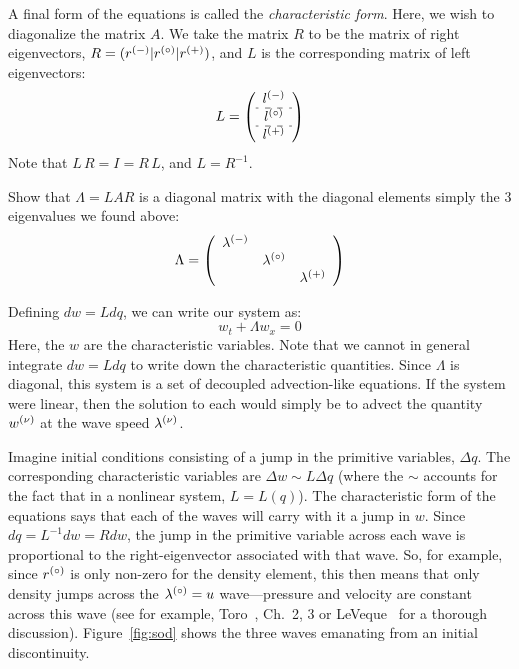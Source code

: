 A final form of the equations is called the {\em characteristic form}.  Here,
we wish to diagonalize the matrix $A$.  We take the matrix $R$ to be the
matrix of right eigenvectors, $R = (r^{(-)} | r^{(\circ)} | r^{(+)} )$, and $L$
is the corresponding matrix of left eigenvectors:
\begin{equation}
L = \left ( \begin{array}{c} l^\evm \\              
                             \hdashline 
                             l^\evz \\
                             \hdashline 
                             l^\evp \end{array} \right )
\end{equation}
Note that $L\, R = I = R\, L$, and
$L = R^{-1}$.
\begin{exercise}
{
Show that $\Lambda = L A R$ is a diagonal matrix with the diagonal elements
simply the 3 eigenvalues we found above:
\begin{equation}
\Lambda = 
   \left ( \begin{array}{ccc}
             \lambda^{(-)} &              & \\
                          & \lambda^{(\circ)} & \\
                          &              & \lambda^{(+)} \end{array} \right )
\end{equation}
}
\end{exercise}
Defining $dw = L dq$, we can write our system as:
\begin{equation}
w_t + \Lambda w_x = 0
\end{equation}
Here, the $w$ are the characteristic variables.  Note that we cannot
in general integrate $dw = L dq$ to write down the characteristic
quantities.  Since $\Lambda$ is diagonal, this system is a set of
decoupled advection-like equations.  If the system were linear, then the
solution to each would simply be to advect the quantity $w^{(\nu)}$ at
the wave speed $\lambda^{(\nu)}$.

Imagine initial conditions consisting of a jump in the primitive
variables, $\Delta q$.  The corresponding characteristic variables are
$\Delta w \sim L \Delta q$ (where the $\sim$ accounts for the fact
that in a nonlinear system, $L = L(q)$).  The characteristic form
of the equations says that each of the waves will carry with it
a jump in $w$.  Since $dq = L^{-1}dw = R dw$, the jump
in the primitive variable across each wave is proportional to the
right-eigenvector associated with that wave.  So, for example, since
$r^{(\circ)}$ is only non-zero for the density element, this then means
that only density jumps across the $\lambda^{(\circ)} = u$ wave---pressure
and velocity are constant across this wave (see for example,
Toro~\cite{toro:1997}, Ch.\ 2, 3 or LeVeque~\cite{leveque:2002} for a
thorough discussion).  Figure~\ref{fig:sod} shows the three waves
emanating from an initial discontinuity.

